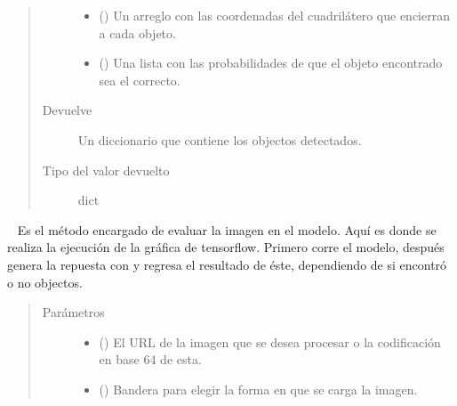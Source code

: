 \begin{fulllineitems}
\begin{fulllineitems}
\begin{fulllineitems}
\begin{quote}
\begin{description}
\begin{itemize}
\item {} 
 () \textendash{} Un arreglo con las coordenadas del cuadrilátero que encierran a cada objeto.

\item {} 
 () \textendash{} Una lista con las probabilidades de que el objeto encontrado sea el correcto.

\end{itemize}

\item[{Devuelve}] \leavevmode
Un diccionario  que contiene los objectos detectados.

\item[{Tipo del valor devuelto}] \leavevmode
dict

\end{description}\end{quote}

\end{fulllineitems}


\begin{fulllineitems}
\label{\detokenize{chapter_two/desc_cloudnao:app.tf_models.object_detection.ObjectDetectionTensorflow.object_detection}}~
Es el método encargado de evaluar la imagen en el modelo. Aquí es donde
se realiza la ejecución de la gráfica de tensorflow.
Primero corre el modelo, después genera la repuesta con {\hyperref[\detokenize{chapter_two/desc_cloudnao:app.tf_models.object_detection.ObjectDetectionTensorflow.create_response}]{}}
y regresa el resultado de éste, dependiendo de si encontró o no objectos.
\begin{quote}\begin{description}
\item[{Parámetros}] \leavevmode\begin{itemize}
\item {} 
 () \textendash{} El URL de la imagen que se desea procesar o la codificación en base 64 de esta.

\item {} 
 () \textendash{} Bandera para elegir la forma en que se carga la imagen.


\end{itemize}
\end{description}
\end{quote}
\end{fulllineitems}
\end{fulllineitems}
\end{fulllineitems}
